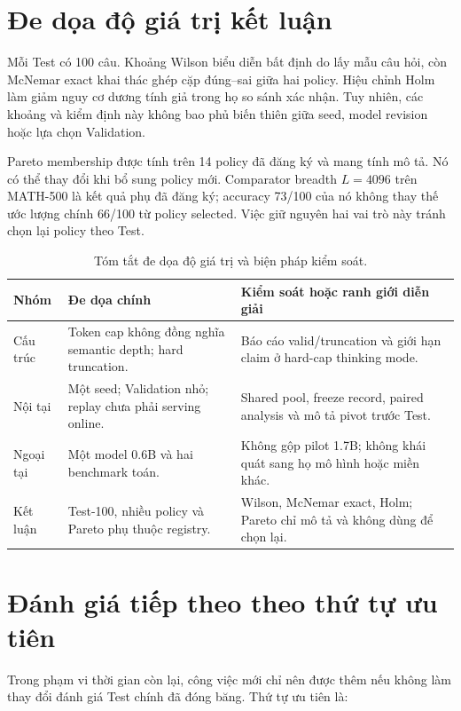 \section{Đe dọa độ giá trị kết luận}

Mỗi Test có 100 câu. Khoảng Wilson biểu diễn bất định do lấy mẫu câu hỏi, còn
McNemar exact khai thác ghép cặp đúng--sai giữa hai policy. Hiệu chỉnh Holm làm
giảm nguy cơ dương tính giả trong họ so sánh xác nhận. Tuy nhiên, các khoảng và
kiểm định này không bao phủ biến thiên giữa seed, model revision hoặc lựa chọn
Validation.

Pareto membership được tính trên 14 policy đã đăng ký và mang tính mô tả. Nó
có thể thay đổi khi bổ sung policy mới. Comparator breadth $L=4096$ trên
MATH-500 là kết quả phụ đã đăng ký; accuracy 73/100 của nó không thay thế ước
lượng chính 66/100 từ policy selected. Việc giữ nguyên hai vai trò này tránh
chọn lại policy theo Test.

\begin{table}[htbp]
  \centering
  \caption{Tóm tắt đe dọa độ giá trị và biện pháp kiểm soát.}
  \label{tab:validity-threats}
  \scriptsize
  \begin{tabular}{p{}p{}p{}}
    \toprule
    Nhóm & Đe dọa chính & Kiểm soát hoặc ranh giới diễn giải \\
    \midrule
    Cấu trúc & Token cap không đồng nghĩa semantic depth; hard truncation. &
    Báo cáo valid/truncation và giới hạn claim ở hard-cap thinking mode. \\
    Nội tại & Một seed; Validation nhỏ; replay chưa phải serving online. &
    Shared pool, freeze record, paired analysis và mô tả pivot trước Test. \\
    Ngoại tại & Một model 0.6B và hai benchmark toán. &
    Không gộp pilot 1.7B; không khái quát sang họ mô hình hoặc miền khác. \\
    Kết luận & Test-100, nhiều policy và Pareto phụ thuộc registry. &
    Wilson, McNemar exact, Holm; Pareto chỉ mô tả và không dùng để chọn lại. \\
    \bottomrule
  \end{tabular}
\end{table}

\section{Đánh giá tiếp theo theo thứ tự ưu tiên}

Trong phạm vi thời gian còn lại, công việc mới chỉ nên được thêm nếu không làm
thay đổi đánh giá Test chính đã đóng băng. Thứ tự ưu tiên là:

